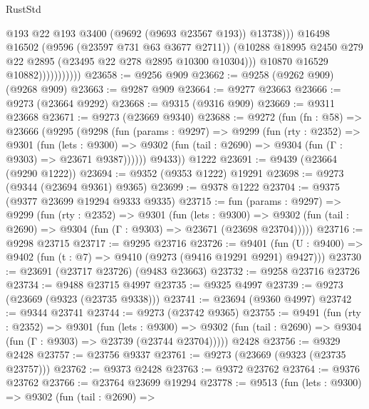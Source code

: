 \begin{lexlean}{RustStd}
\begin{coremodule}
{\begin{coremodule}
{{{{{{{{{{{{{{{{{{{{{{{{{{{{{{{{{{{{{{{{{{{{{{{{{{{{{{{                                  @193
                                  @22
                                  @193
                                  @3400
                                  (@9692 (@9693 @23567 @193))
                                  @13738)))
                            @16498
                            @16502
                            (@9596 (@23597 @731 @63 @3677 @2711))
                            (@10288
                              @18995
                              @2450
                              @279
                              @22
                              @2895
                              (@23495 @22 @278 @2895 @10300 @10304)))
                          @10870
                          @16529
                          @10882)))))))))))
@23658 := @9256 @909
@23662 := @9258 (@9262 @909) (@9268 @909)
@23663 := @9287 @909
@23664 := @9277 @23663
@23666 := @9273 (@23664 @9292)
@23668 := @9315 (@9316 @909)
@23669 := @9311 @23668
@23671 := @9273 (@23669 @9340)
@23688 := @9272
    (fun (fn : @58) =>
    @23666
      (@9295
        (@9298
          (fun (params : @9297) =>
          @9299
            (fun (rty : @2352) =>
            @9301
              (fun (lets : @9300) =>
              @9302 (fun (tail : @2690) => @9304 (fun (Γ : @9303) => @23671 @9387))))))
        @9433))
    @1222
@23691 := @9439 (@23664 (@9290 @1222))
@23694 := @9352 (@9353 @1222) @19291
@23698 := @9273 (@9344 (@23694 @9361) @9365)
@23699 := @9378 @1222
@23704 := @9375 (@9377 @23699 @19294 @9333 @9335)
@23715 := fun (params : @9297) =>
  @9299
    (fun (rty : @2352) =>
    @9301
      (fun (lets : @9300) =>
      @9302 (fun (tail : @2690) => @9304 (fun (Γ : @9303) => @23671 (@23698 @23704)))))
@23716 := @9298 @23715
@23717 := @9295 @23716
@23726 := @9401
    (fun (U : @9400) => @9402 (fun (t : @7) => @9410 (@9273 (@9416 @19291 @9291) @9427)))
@23730 := @23691 (@23717 @23726) (@9483 @23663)
@23732 := @9258 @23716 @23726
@23734 := @9488 @23715 @4997
@23735 := @9325 @4997
@23739 := @9273 (@23669 (@9323 (@23735 @9338)))
@23741 := @23694 (@9360 @4997)
@23742 := @9344 @23741
@23744 := @9273 (@23742 @9365)
@23755 := @9491
    (fun (rty : @2352) =>
    @9301
      (fun (lets : @9300) =>
      @9302 (fun (tail : @2690) => @9304 (fun (Γ : @9303) => @23739 (@23744 @23704)))))
    @2428
@23756 := @9329 @2428
@23757 := @23756 @9337
@23761 := @9273 (@23669 (@9323 (@23735 @23757)))
@23762 := @9373 @2428
@23763 := @9372 @23762
@23764 := @9376 @23762
@23766 := @23764 @23699 @19294
@23778 := @9513
    (fun (lets : @9300) =>
    @9302
      (fun (tail : @2690) =>
}}}}}}}}}}}}}}}}}}}}}}}}}}}}}}}}}}}}}}}}}}}}}}}}}}}}}}}
\end{coremodule}}
\end{coremodule}
\end{lexlean}
